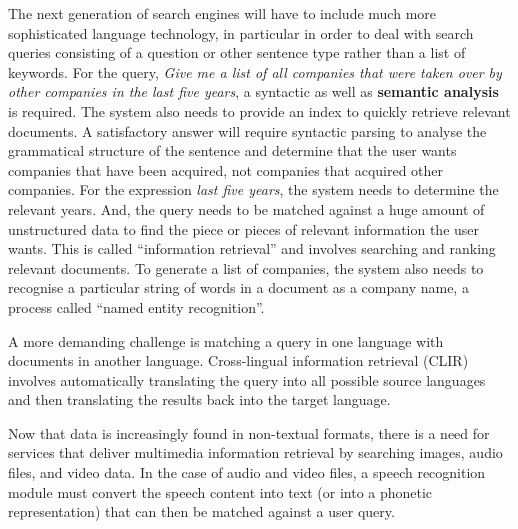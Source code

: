 \begin{multicols}{2}
 The next generation of search engines will have to include much more sophisticated language technology, in particular in order to deal with search queries consisting of a question or other sentence type rather than a list of keywords.  For the query, \textit{Give me a list of all companies that were taken over by other companies in the last five years}, a syntactic as well as \textbf{semantic analysis} is required.  The system also needs to provide an index to quickly retrieve relevant documents.  A satisfactory answer will require syntactic parsing to analyse the grammatical structure of the sentence and determine that the user wants companies that have been acquired, not companies that acquired other companies.  For the expression \textit{last five years}, the system needs to determine the relevant years.  And, the query needs to be matched against a huge amount of unstructured data to find the piece or pieces of relevant information the user wants.  This is called ``information retrieval'' and involves searching and ranking relevant documents.  To generate a list of companies, the system also needs to recognise a particular string of words in a document as a company name, a process called ``named entity recognition''.

A more demanding challenge is matching a query in one language with documents in another language.  Cross-lingual information retrieval (CLIR) involves automatically translating the query into all possible source languages and then translating the results back into the target language.

Now that data is increasingly found in non-textual formats, there is a need for services that deliver multimedia information retrieval by searching images, audio files, and video data.  In the case of audio and video files, a speech recognition module must convert the speech content into text (or into a phonetic representation) that can then be matched against a user query.


\end{multicols}
